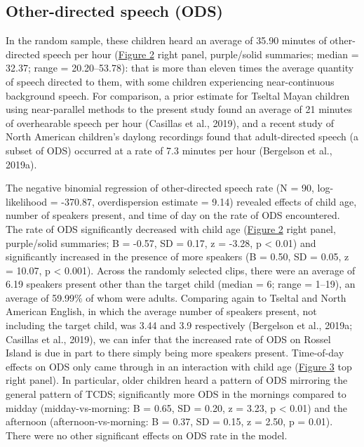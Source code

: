 \documentclass[,man,mask,floatsintext]{apa6}
\begin{document}
\subsection{Other-directed speech
(ODS)}\label{other-directed-speech-ods}

In the random sample, these children heard an average of 35.90 minutes
of other-directed speech per hour (\protect\hyperlink{fig2}{Figure 2}
right panel, purple/solid summaries; median = 32.37; range =
20.20--53.78): that is more than eleven times the average quantity of
speech directed to them, with some children experiencing near-continuous
background speech. For comparison, a prior estimate for Tseltal Mayan
children using near-parallel methods to the present study found an
average of 21 minutes of overhearable speech per hour (Casillas et al.,
2019), and a recent study of North American children's daylong
recordings found that adult-directed speech (a subset of ODS) occurred
at a rate of 7.3 minutes per hour (Bergelson et al., 2019a).

The negative binomial regression of other-directed speech rate (N = 90,
log-likelihood = -370.87, overdispersion estimate = 9.14) revealed
effects of child age, number of speakers present, and time of day on the
rate of ODS encountered. The rate of ODS significantly decreased with
child age (\protect\hyperlink{fig2}{Figure 2} right panel, purple/solid
summaries; B = -0.57, SD = 0.17, z = -3.28, p \textless{} 0.01) and
significantly increased in the presence of more speakers (B = 0.50, SD =
0.05, z = 10.07, p \textless{} 0.001). Across the randomly selected
clips, there were an average of 6.19 speakers present other than the
target child (median = 6; range = 1--19), an average of 59.99\% of whom
were adults. Comparing again to Tseltal and North American English, in
which the average number of speakers present, not including the target
child, was 3.44 and 3.9 respectively (Bergelson et al., 2019a; Casillas
et al., 2019), we can infer that the increased rate of ODS on Rossel
Island is due in part to there simply being more speakers present.
Time-of-day effects on ODS only came through in an interaction with
child age (\protect\hyperlink{fig3}{Figure 3} top right panel). In
particular, older children heard a pattern of ODS mirroring the general
pattern of TCDS; significantly more ODS in the mornings compared to
midday (midday-vs-morning: B = 0.65, SD = 0.20, z = 3.23, p \textless{}
0.01) and the afternoon (afternoon-vs-morning: B = 0.37, SD = 0.15, z =
2.50, p = 0.01). There were no other significant effects on ODS rate in
the model.
\end{document}
